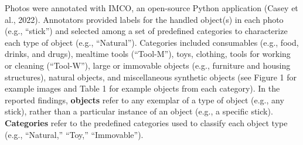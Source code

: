 \documentclass[10pt, letterpaper]{article}
\begin{document}
Photos were annotated with IMCO, an open-source Python application
(Casey et al., 2022). Annotators provided labels for the handled
object(s) in each photo (e.g., ``stick'') and selected among a set of
predefined categories to characterize each type of object (e.g.,
``Natural''). Categories included consumables (e.g., food, drinks, and
drugs), mealtime tools (``Tool-M''), toys, clothing, tools for working
or cleaning (``Tool-W''), large or immovable objects (e.g., furniture
and housing structures), natural objects, and miscellaneous synthetic
objects (see Figure 1 for example images and Table 1 for example objects
from each category). In the reported findings, \textbf{objects} refer to
any exemplar of a type of object (e.g., any stick), rather than a
particular instance of an object (e.g., a specific stick).
\textbf{Categories} refer to the predefined categories used to classify
each object type (e.g., ``Natural,'' ``Toy,'' ``Immovable'').

\begin{table}[!ht]

\caption{\label{tab:top-objects}Number of unique objects (N) and objects handled by the most children, for each category, across sites.}
\centering
{}
\end{table}
\end{document}

